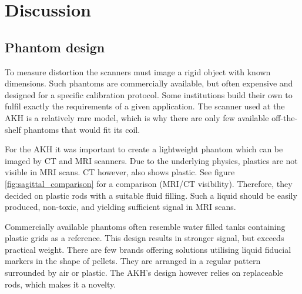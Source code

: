 


\chapter{Discussion}

\section{Phantom design}
    
To measure distortion the scanners must image a rigid object with known dimensions.
Such phantoms are commercially available, but often expensive and designed for a specific calibration protocol.
Some institutions build their own to fulfil exactly the requirements of a given application.
The scanner used at the AKH is a relatively rare model, which is why there are only few available off-the-shelf phantoms that would fit its coil.

For the AKH it was important to create a lightweight phantom which can be imaged by CT and MRI scanners.
Due to the underlying physics, plastics are not visible in MRI scans. CT however, also shows plastic.
See figure \ref{fig:sagittal_comparison} for a comparison (MRI/CT visibility).
Therefore, they decided on plastic rods with a suitable fluid filling.
Such a liquid should be easily produced, non-toxic, and yielding sufficient signal in MRI scans.

Commercially available phantoms often resemble water filled tanks containing plastic grids as a reference.
This design results in stronger signal, but exceeds practical weight.
There are few brands offering solutions utilising liquid fiducial markers in the shape of pellets.
They are arranged in a regular pattern surrounded by air or plastic.
The AKH's design however relies on replaceable rods, which makes it a novelty.


